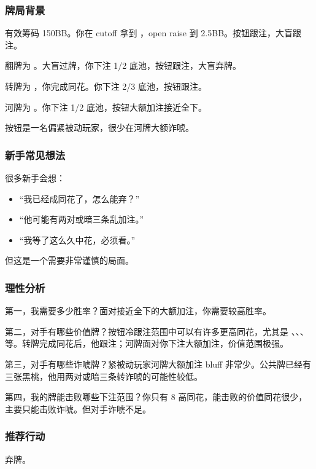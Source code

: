 \subsubsection*{牌局背景}

有效筹码 150BB。你在 cutoff 拿到 ，open raise 到 2.5BB。按钮跟注，大盲跟注。

翻牌为 。大盲过牌，你下注 1/2 底池，按钮跟注，大盲弃牌。

转牌为 ，你完成同花。你下注 2/3 底池，按钮跟注。

河牌为 。你下注 1/2 底池，按钮大额加注接近全下。

按钮是一名偏紧被动玩家，很少在河牌大额诈唬。

\subsubsection*{新手常见想法}

很多新手会想：

\begin{itemize}
\item “我已经成同花了，怎么能弃？”
\item “他可能有两对或暗三条乱加注。”
\item “我等了这么久中花，必须看。”
\end{itemize}

但这是一个需要非常谨慎的局面。

\subsubsection*{理性分析}

第一，我需要多少胜率？面对接近全下的大额加注，你需要较高胜率。

第二，对手有哪些价值牌？按钮冷跟注范围中可以有许多更高同花，尤其是 、、、 等。转牌完成同花后，他跟注；河牌面对你下注大额加注，价值范围极强。

第三，对手有哪些诈唬牌？紧被动玩家河牌大额加注 bluff 非常少。公共牌已经有三张黑桃，他用两对或暗三条转诈唬的可能性较低。

第四，我的牌能击败哪些下注范围？你只有 8 高同花，能击败的价值同花很少，主要只能击败诈唬。但对手诈唬不足。

\subsubsection*{推荐行动}

弃牌。

